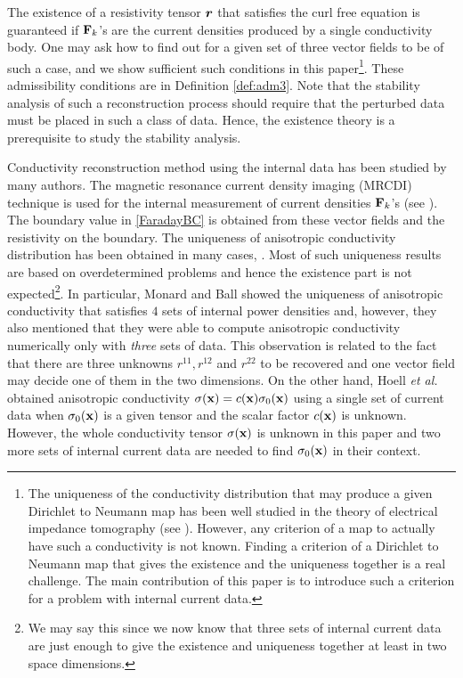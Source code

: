 \documentclass[11pt]{amsart}
\theoremstyle{plain}
\numberwithin{equation}{section}
\numberwithin{Thm}{section}
\def\F{{\bf F}}
\def\r{{\bf r}}
\def\x{{\bf x}}
\def\r{\mbox{\boldmath$r$}}
\begin{document}
The existence of a resistivity tensor $\r$ that satisfies the curl free equation is guaranteed if $\F_k$'s are the current densities produced by a single conductivity body. One may ask how to find out for a given set of three vector fields to be of such a case, and we show sufficient such conditions in this paper\footnote{The uniqueness of the conductivity distribution that may produce a given Dirichlet to Neumann map has been well studied in the theory of electrical impedance tomography (see \cite{nachman_global_1996,sylvester_global_1987}). However, any criterion of a map to actually have such a conductivity is not known. Finding a criterion of a Dirichlet to Neumann map that gives the existence and the uniqueness together is a real challenge. The main contribution of this paper is to introduce such a criterion for a problem with internal current data.}. These admissibility conditions are in Definition \ref{def:adm3}. Note that the stability analysis of such a reconstruction process should require that the perturbed data must be placed in such a class of data. Hence, the existence theory is a prerequisite to study the stability analysis.

Conductivity reconstruction method using the internal data has been studied by many authors. The magnetic resonance current density imaging (MRCDI) technique is used for the internal measurement of current densities $\F_k$'s (see \cite{Gamba,Joy,Scott}). The boundary value in \eqref{FaradayBC} is obtained from these vector fields and the resistivity on the boundary. The uniqueness of anisotropic conductivity distribution has been obtained in many cases, \cite{bal_inverse_2011, doi:10.1137/140961754, bal_inverse_2014,MR3206987, monard_inverse_2012-1,monard_inverse_2012,doi:10.1080/03605302.2013.787089}. Most of such uniqueness results are based on overdetermined problems and hence the existence part is not expected\footnote{We may say this since we now know that three sets of internal current data are just enough to give the existence and uniqueness together at least in two space dimensions.}. In particular, Monard and Ball \cite{monard_inverse_2012-1} showed the uniqueness of anisotropic conductivity that satisfies $4$ sets of internal power densities and, however, they also mentioned that they were able to compute anisotropic conductivity numerically only with \emph{three} sets of data. This observation is related to the fact that there are three unknowns $r^{11},r^{12}$ and $r^{22}$ to be recovered and one vector field may decide one of them in the two dimensions. On the other hand, Hoell \emph{et al.} \cite{MR3206987} obtained anisotropic conductivity $\sigma(\x)=c(\x)\sigma_0(\x)$ using a single set of current data when $\sigma_0(\x)$ is a given tensor and the scalar factor $c(\x)$ is unknown. However, the whole conductivity tensor $\sigma(\x)$ is unknown in this paper and two more sets of internal current data are needed to find $\sigma_0(\x)$ in their context.
\end{document}
